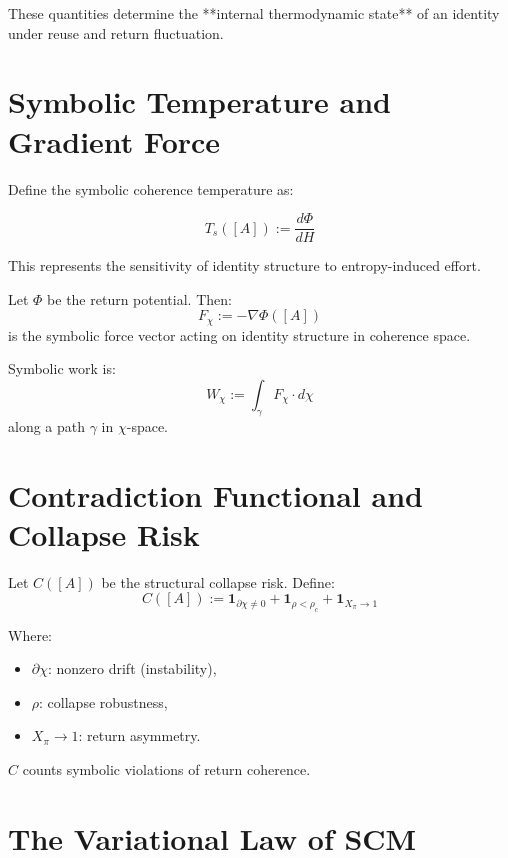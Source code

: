 These quantities determine the **internal thermodynamic state** of an identity under reuse and return fluctuation.

\section{Symbolic Temperature and Gradient Force}

Define the symbolic coherence temperature as:

\begin{equation}
T_s([A]) := \frac{d\Phi}{dH}
\end{equation}

\noindent This represents the sensitivity of identity structure to entropy-induced effort.

\begin{definition}
Let $\Phi$ be the return potential. Then:
\[
F_\chi := -\nabla \Phi([A])
\]
is the symbolic force vector acting on identity structure in coherence space.
\end{definition}

\noindent Symbolic work is:
\[
W_\chi := \int_\gamma F_\chi \cdot d\chi
\]
along a path $\gamma$ in $\chi$-space.

\section{Contradiction Functional and Collapse Risk}

\begin{definition}
Let $C([A])$ be the structural collapse risk. Define:
\[
C([A]) := \mathbf{1}_{\partial \chi \neq 0} + \mathbf{1}_{\rho < \rho_c} + \mathbf{1}_{X_\pi \to 1}
\]
\end{definition}

Where:
\begin{itemize}
    \item $\partial \chi$: nonzero drift (instability),
    \item $\rho$: collapse robustness,
    \item $X_\pi \to 1$: return asymmetry.
\end{itemize}

$C$ counts symbolic violations of return coherence.

\section{The Variational Law of SCM}

